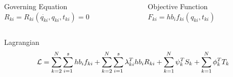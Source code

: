 \documentclass{beamer}
\begin{document}
\begin{frame}[allowframebreaks]
\begin{columns}[T]
\begin{column}{.42\textwidth}
\begin{block}{Governing Equation}
        $R_{ki} = R_{ki}(\dot{q_{ki}},q_{ki},t_{ki})=0$
      \end{block}
    \end{column}%
    \hfill
    \begin{column}{.58\textwidth}
      \begin{block}{Objective Function}\centering
        $F_{ki} =  h b_i f_{ki}(q_{ki},t_{ki})$
      \end{block}
    \end{column}%
  \end{columns}
  \medskip
  \begin{columns}[T] %
    \begin{column}{1.0\textwidth}
      \begin{block}{Lagrangian}\vspace{-0.75cm}\centering
        \[ {\cal{L}} = \sum_{k=2}^{N} \sum_{i=1}^s h b_i f_{ki}  +  \sum_{k=2}^{N} \sum_{i=1}^s\lambda_{ki}^T  h b_i R_{ki}  + \sum_{k=1}^N \psi_k^T S_k + \sum_{k=1}^N \phi_k^T T_k\]
      \end{block}
    \end{column}%
  \end{columns}
\end{frame}
\end{document}
